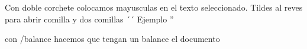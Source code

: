 Con doble corchete colocamos mayusculas en el texto seleccionado.
Tildes al reves para abrir comilla y dos comillas
 ´´ Ejemplo ''

 con /balance hacemos que tengan un balance el documento

\balance
